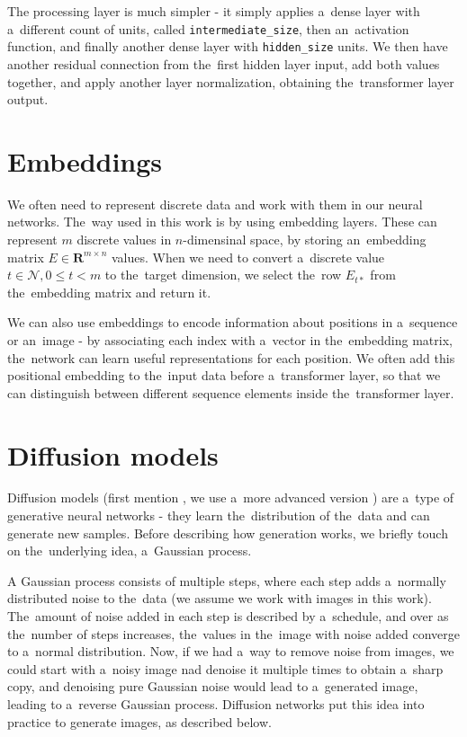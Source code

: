 The processing layer is much simpler - it simply applies a~dense layer with a~different count of units, called \texttt{intermediate\_size}, then an~activation function, and finally another dense layer with \texttt{hidden\_size} units. We then have another residual connection from the~first hidden layer input, add both values together, and apply another layer normalization, obtaining the~transformer layer output.




\section{Embeddings}

We often need to represent discrete data and work with them in our neural networks. The~way used in this work is by using embedding layers. These can represent $m$ discrete values in $n$-dimensinal space, by storing an~embedding matrix $E \in \mathbf{R}^{m \times n}$ values. When we need to convert a~discrete value $t \in \mathcal{N}, 0 \leq t < m$ to the~target dimension, we select the~row $E_{t*}$ from the~embedding matrix and return it.

We can also use embeddings to encode information about positions in a~sequence or an~image - by associating each index with a~vector in the~embedding matrix, the~network can learn useful representations for each position. We often add this positional embedding to the~input data before a~transformer layer, so that we can distinguish between different sequence elements inside the~transformer layer.


\section{Diffusion models}

Diffusion models (first mention \citep{diffusion_model_ddpm}, we use a~more advanced version \citep{diffusion_model_ddim}) are a~type of generative neural networks - they learn the~distribution of the~data and can generate new samples. Before describing how generation works, we briefly touch on the~underlying idea, a~Gaussian process.

A Gaussian process consists of multiple steps, where each step adds a~normally distributed noise to the~data (we assume we work with images in this work). The~amount of noise added in each step is described by a~schedule, and over as the~number of steps increases, the~values in the~image with noise added converge to a~normal distribution. Now, if we had a~way to remove noise from images, we could start with a~noisy image nad denoise it multiple times to obtain a~sharp copy, and denoising pure Gaussian noise would lead to a~generated image, leading to a~reverse Gaussian process. Diffusion networks put this idea into practice to generate images, as described below.

